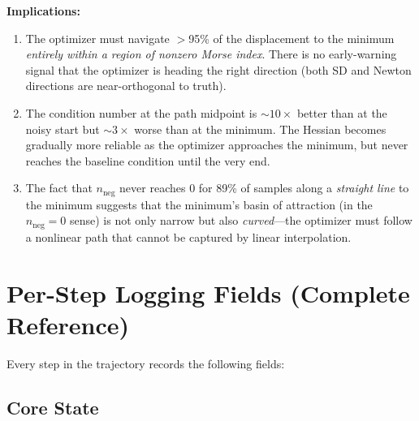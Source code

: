 \documentclass[11pt,a4paper]{article}
\begin{document}
\textbf{Implications:}
\begin{enumerate}
  \item The optimizer must navigate $>$95\% of the displacement to the minimum \emph{entirely within a region of nonzero Morse index}. There is no early-warning signal that the optimizer is heading the right direction (both SD and Newton directions are near-orthogonal to truth).
  \item The condition number at the path midpoint is $\sim\!10\times$ better than at the noisy start but $\sim\!3\times$ worse than at the minimum. The Hessian becomes gradually more reliable as the optimizer approaches the minimum, but never reaches the baseline condition until the very end.
  \item The fact that $n_\text{neg}$ never reaches 0 for 89\% of samples along a \emph{straight line} to the minimum suggests that the minimum's basin of attraction (in the $n_\text{neg} = 0$ sense) is not only narrow but also \emph{curved}---the optimizer must follow a nonlinear path that cannot be captured by linear interpolation.
\end{enumerate}

\section{Per-Step Logging Fields (Complete Reference)}
\label{sec:logging}

Every step in the trajectory records the following fields:

\subsection{Core State}
\end{document}
